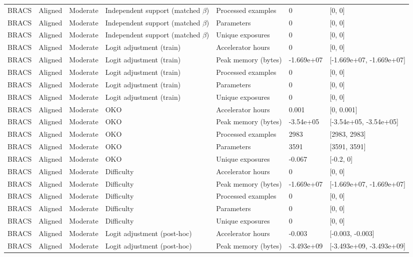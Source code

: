 \begin{longtable}{lllllll}
BRACS & Aligned & Moderate & Independent support (matched $\beta$) & Processed examples & 0 & [0, 0] \\
BRACS & Aligned & Moderate & Independent support (matched $\beta$) & Parameters & 0 & [0, 0] \\
BRACS & Aligned & Moderate & Independent support (matched $\beta$) & Unique exposures & 0 & [0, 0] \\
BRACS & Aligned & Moderate & Logit adjustment (train) & Accelerator hours & 0 & [0, 0] \\
BRACS & Aligned & Moderate & Logit adjustment (train) & Peak memory (bytes) & -1.669e+07 & [-1.669e+07, -1.669e+07] \\
BRACS & Aligned & Moderate & Logit adjustment (train) & Processed examples & 0 & [0, 0] \\
BRACS & Aligned & Moderate & Logit adjustment (train) & Parameters & 0 & [0, 0] \\
BRACS & Aligned & Moderate & Logit adjustment (train) & Unique exposures & 0 & [0, 0] \\
BRACS & Aligned & Moderate & OKO & Accelerator hours & 0.001 & [0, 0.001] \\
BRACS & Aligned & Moderate & OKO & Peak memory (bytes) & -3.54e+05 & [-3.54e+05, -3.54e+05] \\
BRACS & Aligned & Moderate & OKO & Processed examples & 2983 & [2983, 2983] \\
BRACS & Aligned & Moderate & OKO & Parameters & 3591 & [3591, 3591] \\
BRACS & Aligned & Moderate & OKO & Unique exposures & -0.067 & [-0.2, 0] \\
BRACS & Aligned & Moderate & Difficulty & Accelerator hours & 0 & [0, 0] \\
BRACS & Aligned & Moderate & Difficulty & Peak memory (bytes) & -1.669e+07 & [-1.669e+07, -1.669e+07] \\
BRACS & Aligned & Moderate & Difficulty & Processed examples & 0 & [0, 0] \\
BRACS & Aligned & Moderate & Difficulty & Parameters & 0 & [0, 0] \\
BRACS & Aligned & Moderate & Difficulty & Unique exposures & 0 & [0, 0] \\
BRACS & Aligned & Moderate & Logit adjustment (post-hoc) & Accelerator hours & -0.003 & [-0.003, -0.003] \\
BRACS & Aligned & Moderate & Logit adjustment (post-hoc) & Peak memory (bytes) & -3.493e+09 & [-3.493e+09, -3.493e+09] \\

\end{longtable}

